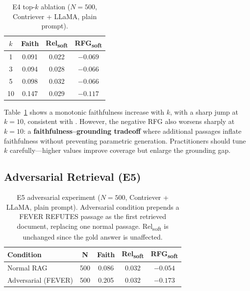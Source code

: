 \documentclass[11pt]{article}
\begin{document}
\begin{table}[t]
\centering
\small
\setlength{\tabcolsep}{6pt}
\begin{tabular}{@{} c c c c @{}}
\toprule
$k$ & \textbf{Faith}
  & \textbf{Rel\textsubscript{soft}} & \textbf{RFG\textsubscript{soft}} \\
\midrule
 1 & 0.091 & 0.022 & $-0.069$ \\
 3 & 0.094 & 0.028 & $-0.066$ \\
 5 & 0.098 & 0.032 & $-0.066$ \\
10 & 0.147 & 0.029 & $-0.117$ \\
\bottomrule
\end{tabular}
\caption{
  E4 top-$k$ ablation ($N{=}500$, Contriever + LLaMA, plain prompt).
}
\label{tab:e4}
\end{table}

Table~\ref{tab:e4} shows a monotonic faithfulness increase with $k$, with
a sharp jump at $k{=}10$, consistent with \citet{liu2023lost}.
However, the negative RFG also worsens sharply at $k{=}10$: a
\textbf{faithfulness--grounding tradeoff} where additional passages inflate
faithfulness without preventing parametric generation.
Practitioners should tune $k$ carefully---higher values improve coverage
but enlarge the grounding gap.

\subsection{Adversarial Retrieval (E5)}

\begin{table}[t]
\centering
\small
\setlength{\tabcolsep}{4pt}
\begin{tabular}{@{} l c c c c @{}}
\toprule
\textbf{Condition} & \textbf{N}
  & \textbf{Faith} & \textbf{Rel\textsubscript{soft}}
  & \textbf{RFG\textsubscript{soft}} \\
\midrule
Normal RAG          & 500 & 0.086 & 0.032 & $-0.054$ \\
Adversarial (FEVER) & 500 & 0.205 & 0.032 & $-0.173$ \\
\bottomrule
\end{tabular}
\caption{
  E5 adversarial experiment ($N{=}500$, Contriever + LLaMA, plain prompt).
  Adversarial condition prepends a FEVER REFUTES passage as the first
  retrieved document, replacing one normal passage.
  Rel\textsubscript{soft} is unchanged since the gold answer is unaffected.
}
\label{tab:e5}
\end{table}
\end{document}
